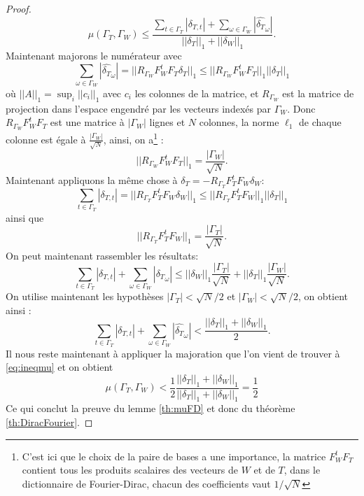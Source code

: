 	\begin{proof}
		\begin{equation}\label{eq:ineqmu}
			\mu(\Gamma_T, \Gamma_W) \leq \frac{\sum_{t \in \Gamma_T} |\delta_{T, t}| + \sum_{\omega \in \Gamma_W} |\widehat{\delta_{T}}_\omega|}{||\delta_T||_1 + ||\delta_W||_1}. 
		\end{equation}
		Maintenant majorons le numérateur avec 
		\begin{equation}\label{eq:ineqnum}
			\sum_{\omega \in \Gamma_W} |\widehat{\delta_T}_\omega| = ||R_{\Gamma_W} F_W^t F_T \delta_T||_1 \leq ||R_{\Gamma_W} F_W^t F_T ||_1 ||\delta_T||_1 
		\end{equation}
		où $||A||_1 = \sup_i ||c_i||_1$ avec $c_i$ les colonnes de la matrice, et $R_{\Gamma_W}$ est la matrice de projection dans l'espace engendré par les vecteurs indexés par $\Gamma_W$.
		Donc $R_{\Gamma_W} F_W^t F_T$ est une matrice à $|\Gamma_W|$ lignes et $N$ colonnes, la norme $\ell_1$ de chaque colonne est égale à $\frac{|\Gamma_W|}{\sqrt{N}}$, ainsi, on a\footnote{C'est ici que le choix de la paire de bases a une importance, la matrice $F_W^t F_T$ contient tous les produits scalaires des vecteurs de $W$ et de $T$, dans le dictionnaire de Fourier-Dirac, chacun des coefficients vaut $1/\sqrt{N}$} :
		\begin{equation}\label{eq:ineqdelta1}
			||R_{\Gamma_W} F_W^t F_T||_1 = \frac{|\Gamma_W|}{\sqrt{N}}.
		\end{equation}	
			Maintenant appliquons la même chose à $\delta_T = -R_{\Gamma_T}F_T^tF_W \delta_W$:
			\begin{equation}
				\sum_{t \in \Gamma_T} |\delta_{T,t}| = ||R_{\Gamma_T} F_T^t F_W \delta_W||_1 \leq ||R_{\Gamma_T} F_T^t F_W ||_1 ||\delta_T||_1 
			\end{equation}
		ainsi que
		\begin{equation}
			||R_{\Gamma_T} F_T^t F_W||_1 = \frac{|\Gamma_T|}{\sqrt{N}}.
		\end{equation}
		On peut maintenant rassembler les résultats:
		\begin{equation}
			\sum_{t \in \Gamma_T} |\delta_{T, t}| + \sum_{\omega \in \Gamma_W} |\widehat{\delta_T}_\omega| 
			\leq ||\delta_{W}||_1 \frac{|\Gamma_T|}{\sqrt{N}} + ||\delta_{T}||_1 \frac{|\Gamma_W|}{\sqrt{N}}. 
		\end{equation}
			On utilise maintenant les hypothèses $|\Gamma_T| < \sqrt{N}/2$ et $|\Gamma_W| < \sqrt{N}/2$, on obtient ainsi :
		\begin{equation}
			\sum_{t \in \Gamma_T} |\delta_{T, t}| + \sum_{\omega \in \Gamma_W} |\widehat{\delta_T}_\omega| 
			< \frac{||\delta_{T}||_1 + ||\delta_{W}||_1 }{2}.
		\end{equation}
			Il nous reste maintenant à appliquer la majoration que l'on vient de trouver à \ref{eq:ineqmu} et on obtient
		\begin{equation}
			\mu(\Gamma_T, \Gamma_W) < \frac{1}{2} \frac{||\delta_T||_1 + ||\delta_W||_1}{||\delta_T||_1 + ||\delta_W||_1} = \frac{1}{2} 
		\end{equation}
			Ce qui conclut la preuve du lemme \ref{th:muFD} et donc du théorème \ref{th:DiracFourier}.
	\end{proof}





